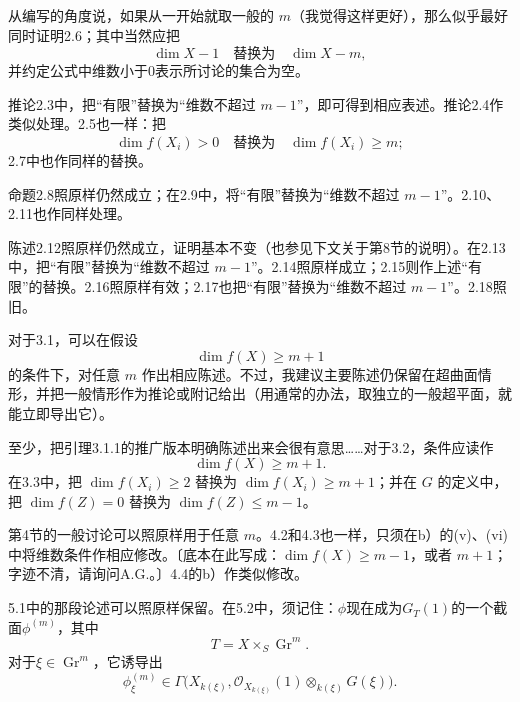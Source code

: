 从编写的角度说，如果从一开始就取一般的 $m$（我觉得这样更好），那么似乎最好同时证明2.6；其中当然应把
\[
\dim X-1\quad\text{替换为}\quad\dim X-m,
\]
并约定公式中维数小于0表示所讨论的集合为空。

推论2.3中，把“有限”替换为“维数不超过 $m-1$”，即可得到相应表述。推论2.4作类似处理。2.5也一样：把
\[
\dim f(X_i)>0\quad\text{替换为}\quad\dim f(X_i)\geq m;
\]
2.7中也作同样的替换。

命题2.8照原样仍然成立；在2.9中，将“有限”替换为“维数不超过 $m-1$”。2.10、2.11也作同样处理。

陈述2.12照原样仍然成立，证明基本不变（也参见下文关于第8节的说明）。在2.13中，把“有限”替换为“维数不超过 $m-1$”。2.14照原样成立；2.15则作上述“有限”的替换。2.16照原样有效；2.17也把“有限”替换为“维数不超过 $m-1$”。2.18照旧。

对于3.1，可以在假设
\[
\dim f(X)\geq m+1
\]
的条件下，对任意 $m$ 作出相应陈述。不过，我建议主要陈述仍保留在超曲面情形，并把一般情形作为推论或附记给出（用通常的办法，取独立的一般超平面，就能立即导出它）。

至少，把引理3.1.1的推广版本明确陈述出来会很有意思……对于3.2，条件应读作
\[
\dim f(X)\geq m+1.
\]
在3.3中，把 $\dim f(X_i)\geq2$ 替换为 $\dim f(X_i)\geq m+1$；并在 $G$ 的定义中，把 $\dim f(Z)=0$ 替换为 $\dim f(Z)\leq m-1$。

第4节的一般讨论可以照原样用于任意 $m$。4.2和4.3也一样，只须在b）的(v)、(vi)中将维数条件作相应修改。〔底本在此写成：$\dim f(X)\geq m-1$，或者 $m+1$；字迹不清，请询问A.G.。〕4.4的b）作类似修改。


5.1中的那段论述可以照原样保留。在5.2中，须记住：$\phi$现在成为$G_T(1)$的一个截面$\phi^{(m)}$，其中
\[
T=X\times_S\operatorname{Gr}^{m}.
\]
对于$\xi\in\operatorname{Gr}^{m}$，它诱导出
\[
\phi^{(m)}_{\xi}\in
\Gamma\bigl(X_{k(\xi)},\mathcal O_{X_{k(\xi)}}(1)\otimes_{k(\xi)}G(\xi)\bigr).
\]


